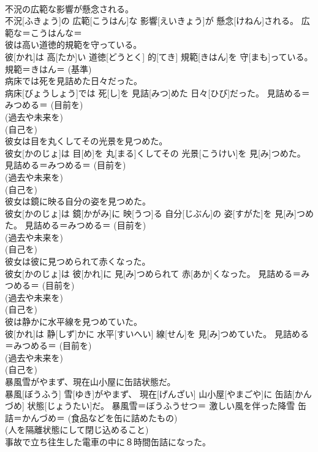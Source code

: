 \documentclass[8pt]{extreport}
\begin{document}
\begin{CJK}{UTF8}{min}
{\\	不況の広範な影響が懸念される。	
\\	不況[ふきょう]の 広範[こうはん]な 影響[えいきょう]が 懸念[けねん]される。	広範な＝こうはんな＝ 
\\	彼は高い道徳的規範を守っている。	
\\	彼[かれ]は 高[たか]い 道徳[どうとく] 的[てき] 規範[きはん]を 守[まも]っている。	規範＝きはん＝ (基準) 
\\	病床では死を見詰めた日々だった。	
\\	病床[びょうしょう]では 死[し]を 見詰[みつ]めた 日々[ひび]だった。	見詰める＝みつめる＝ (目前を) 
\\	(過去や未来を) 
\\	(自己を) 
\\	彼女は目を丸くしてその光景を見つめた。	
\\	彼女[かのじょ]は 目[め]を 丸[まる]くしてその 光景[こうけい]を 見[み]つめた。	見詰める＝みつめる＝ (目前を) 
\\	(過去や未来を) 
\\	(自己を) 
\\	彼女は鏡に映る自分の姿を見つめた。	
\\	彼女[かのじょ]は 鏡[かがみ]に 映[うつ]る 自分[じぶん]の 姿[すがた]を 見[み]つめた。	見詰める＝みつめる＝ (目前を) 
\\	(過去や未来を) 
\\	(自己を) 
\\	彼女は彼に見つめられて赤くなった。	
\\	彼女[かのじょ]は 彼[かれ]に 見[み]つめられて 赤[あか]くなった。	見詰める＝みつめる＝ (目前を) 
\\	(過去や未来を) 
\\	(自己を) 
\\	彼は静かに水平線を見つめていた。	
\\	彼[かれ]は 静[しず]かに 水平[すいへい] 線[せん]を 見[み]つめていた。	見詰める＝みつめる＝ (目前を) 
\\	(過去や未来を) 
\\	(自己を) 
\\	暴風雪がやまず、現在山小屋に缶詰状態だ。	
\\	暴風[ぼうふう] 雪[ゆき]がやまず、 現在[げんざい] 山小屋[やまごや]に 缶詰[かんづめ] 状態[じょうたい]だ。	暴風雪＝ぼうふうせつ＝ 激しい風を伴った降雪 缶詰＝かんづめ＝ (食品などを缶に詰めたもの) 
\\	(人を隔離状態にして閉じ込めること) 
\\	事故で立ち往生した電車の中に８時間缶詰になった。	
}
\end{CJK}
\end{document}

